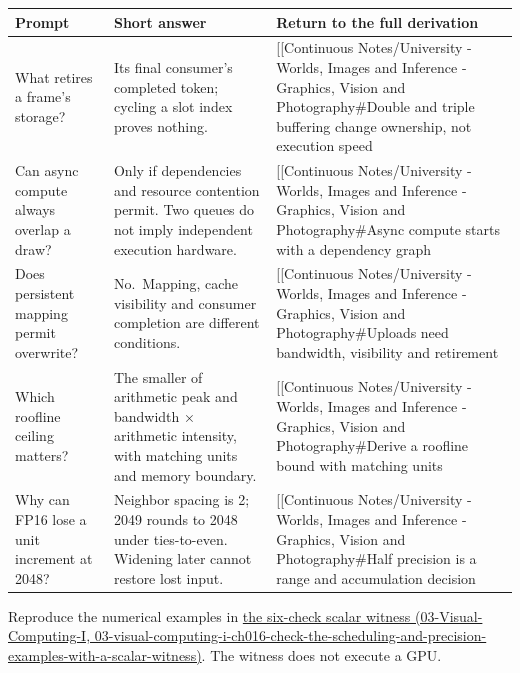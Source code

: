 {\def\LTcaptype{none} %
\begin{longtable}[]{@{}
  >{\raggedright\arraybackslash}p{}
  >{\raggedright\arraybackslash}p{}
  >{\raggedright\arraybackslash}p{}@{}}
\toprule\noalign{}
\begin{minipage}[b]{\linewidth}\raggedright
Prompt
\end{minipage} & \begin{minipage}[b]{\linewidth}\raggedright
Short answer
\end{minipage} & \begin{minipage}[b]{\linewidth}\raggedright
Return to the full derivation
\end{minipage} \\
\midrule\noalign{}
\endhead
\bottomrule\noalign{}
\endlastfoot
What retires a frame's storage? & Its final consumer's completed token; cycling a slot index proves nothing. & {[}{[}Continuous Notes/University - Worlds, Images and Inference - Graphics, Vision and Photography\#Double and triple buffering change ownership, not execution speed \\
Can async compute always overlap a draw? & Only if dependencies and resource contention permit. Two queues do not imply independent execution hardware. & {[}{[}Continuous Notes/University - Worlds, Images and Inference - Graphics, Vision and Photography\#Async compute starts with a dependency graph \\
Does persistent mapping permit overwrite? & No.~Mapping, cache visibility and consumer completion are different conditions. & {[}{[}Continuous Notes/University - Worlds, Images and Inference - Graphics, Vision and Photography\#Uploads need bandwidth, visibility and retirement \\
Which roofline ceiling matters? & The smaller of arithmetic peak and bandwidth × arithmetic intensity, with matching units and memory boundary. & {[}{[}Continuous Notes/University - Worlds, Images and Inference - Graphics, Vision and Photography\#Derive a roofline bound with matching units \\
Why can FP16 lose a unit increment at 2048? & Neighbor spacing is 2; 2049 rounds to 2048 under ties-to-even. Widening later cannot restore lost input. & {[}{[}Continuous Notes/University - Worlds, Images and Inference - Graphics, Vision and Photography\#Half precision is a range and accumulation decision \\
\end{longtable}
}

Reproduce the numerical examples in \href{../03-Visual-Computing-I/main.pdf\#nameddest=03-visual-computing-i-ch016-check-the-scheduling-and-precision-examples-with-a-scalar-witness}{the six-check scalar witness (03-Visual-Computing-I, 03-visual-computing-i-ch016-check-the-scheduling-and-precision-examples-with-a-scalar-witness)}. The witness does not execute a GPU.
